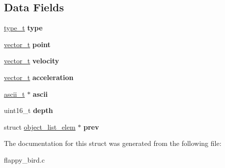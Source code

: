 \subsection*{Data Fields}
\begin{DoxyCompactItemize}
\item 
\hyperlink{object__list_8h_adee610a3c7375031538811d29f6a4124}{type\+\_\+t} {\bfseries type}\hypertarget{structobject__list__elem__t_a2a091e617e92fb4705dc37526803e93a}{}\label{structobject__list__elem__t_a2a091e617e92fb4705dc37526803e93a}

\item 
\hyperlink{structvector__t}{vector\+\_\+t} {\bfseries point}\hypertarget{structobject__list__elem__t_a22808567b3e124f69487e5405f6371fb}{}\label{structobject__list__elem__t_a22808567b3e124f69487e5405f6371fb}

\item 
\hyperlink{structvector__t}{vector\+\_\+t} {\bfseries velocity}\hypertarget{structobject__list__elem__t_a4addcc9c95c12d90c28adaf0b9a1a7a5}{}\label{structobject__list__elem__t_a4addcc9c95c12d90c28adaf0b9a1a7a5}

\item 
\hyperlink{structvector__t}{vector\+\_\+t} {\bfseries acceleration}\hypertarget{structobject__list__elem__t_afb9235562fcb2d64ca594de133237e4c}{}\label{structobject__list__elem__t_afb9235562fcb2d64ca594de133237e4c}

\item 
\hyperlink{structascii__t}{ascii\+\_\+t} $\ast$ {\bfseries ascii}\hypertarget{structobject__list__elem__t_a6cf92fc05b6904f73ed2a6d46a46bfcf}{}\label{structobject__list__elem__t_a6cf92fc05b6904f73ed2a6d46a46bfcf}

\item 
uint16\+\_\+t {\bfseries depth}\hypertarget{structobject__list__elem__t_a226f1ad4c575da7ea3853902c8eff9b7}{}\label{structobject__list__elem__t_a226f1ad4c575da7ea3853902c8eff9b7}

\item 
struct \hyperlink{structobject__list__elem}{object\+\_\+list\+\_\+elem} $\ast$ {\bfseries prev}\hypertarget{structobject__list__elem__t_a4008c76027a9e2e3e4eb34b205bc646b}{}\label{structobject__list__elem__t_a4008c76027a9e2e3e4eb34b205bc646b}

\end{DoxyCompactItemize}


The documentation for this struct was generated from the following file\+:\begin{DoxyCompactItemize}
\item 
flappy\+\_\+bird.\+c\end{DoxyCompactItemize}
